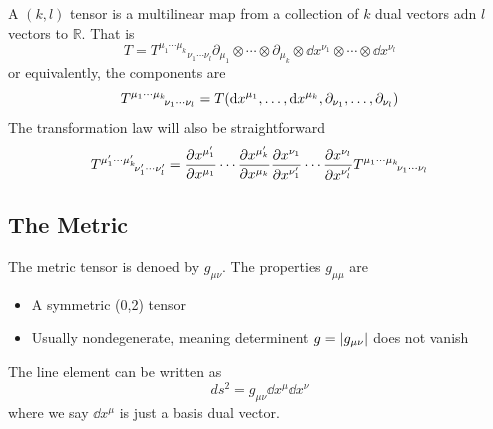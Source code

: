 \documentclass[11pt]{article}
\theoremstyle{definition}
\numberwithin{equation}{section}
\begin{document}
A $(k,l)$ tensor is a multilinear map from a collection of $k$ dual vectors adn $l$ vectors to $\mathbb{R}$. That is 
\begin{equation}
    T=T^{\mu_1\cdots\mu_k} \!_{\nu_1\cdots\nu_l}\partial_{\mu_1}\otimes\cdots\otimes\partial_{\mu_k}\otimes\dd x^{\nu_1}\otimes\cdots\otimes\dd x^{\nu_l}
\end{equation}
or equivalently, the components are 
\begin{equation}
    T^{\mu_1\cdots\mu_k} \!_{\nu_1\cdots\nu_l}=T\qty(\dd x^{\mu_1},\dots,\dd x^{\mu_k},\partial_{\nu_1},\dots,\partial_{\nu_l})
\end{equation}
The transformation law will also be straightforward
\begin{equation}
    T^{\mu_1'\cdots\mu_k'} \!_{\nu_1'\cdots\nu_l'}=\pdv{x^{\mu_1'}}{x^{\mu_1}}\cdots \pdv{x^{\mu_k'}}{x^{\mu_k}}\pdv{x^{\nu_1}}{x^{\nu_1'}}\cdots\pdv{x^{\nu_l}}{x^{\nu_l'}}T^{\mu_1\cdots\mu_k} \!_{\nu_1\cdots\nu_l}
\end{equation}

\subsection{The Metric}
The metric tensor is denoed by $g_{\mu\nu}$. The properties $g_{\mu\mu}$ are 
\begin{itemize}
    \item A symmetric (0,2) tensor 
    \item Usually nondegenerate, meaning determinent $g=\abs{g_{\mu\nu}}$ does not vanish
\end{itemize}
The line element can be written as 
\begin{equation}
    ds^2=g_{\mu\nu}\dd x^\mu\dd x^\nu
\end{equation}
where we say $\dd x^\mu$ is just a basis dual vector.
\end{document}
